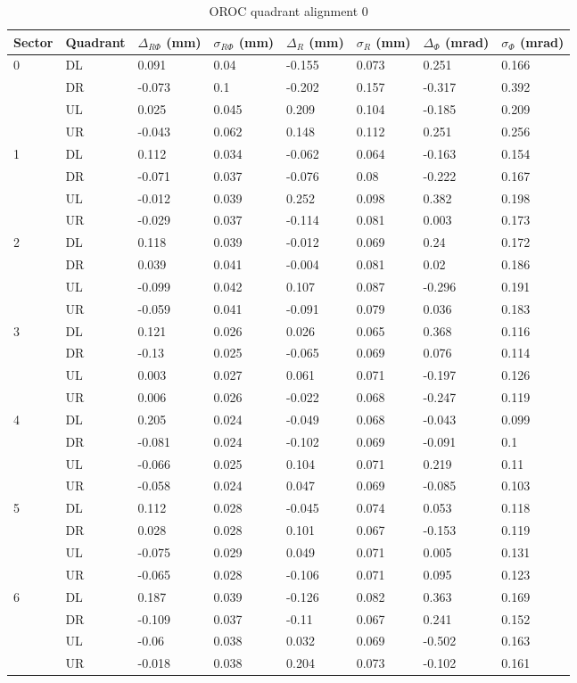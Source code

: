 \begin{table}
\caption{OROC quadrant alignment 0}
\begin{tabular}{|l|l|l|l|l|l|l|l|} \hline
Sector & Quadrant & $\Delta_{R\Phi}$ (mm)& $\sigma_{R\Phi}$ (mm) &
 $\Delta_{R}$ (mm)& $\sigma_{R}$ (mm) & $\Delta_{\Phi}$ (mrad)& $\sigma_{\Phi}$ (mrad)\\ \hline
0&DL&0.091&0.04&-0.155&0.073&0.251&0.166\\ \hline
&DR&-0.073&0.1&-0.202&0.157&-0.317&0.392\\ \hline
&UL&0.025&0.045&0.209&0.104&-0.185&0.209\\ \hline
&UR&-0.043&0.062&0.148&0.112&0.251&0.256\\ \hline
1&DL&0.112&0.034&-0.062&0.064&-0.163&0.154\\ \hline
&DR&-0.071&0.037&-0.076&0.08&-0.222&0.167\\ \hline
&UL&-0.012&0.039&0.252&0.098&0.382&0.198\\ \hline
&UR&-0.029&0.037&-0.114&0.081&0.003&0.173\\ \hline
2&DL&0.118&0.039&-0.012&0.069&0.24&0.172\\ \hline
&DR&0.039&0.041&-0.004&0.081&0.02&0.186\\ \hline
&UL&-0.099&0.042&0.107&0.087&-0.296&0.191\\ \hline
&UR&-0.059&0.041&-0.091&0.079&0.036&0.183\\ \hline
3&DL&0.121&0.026&0.026&0.065&0.368&0.116\\ \hline
&DR&-0.13&0.025&-0.065&0.069&0.076&0.114\\ \hline
&UL&0.003&0.027&0.061&0.071&-0.197&0.126\\ \hline
&UR&0.006&0.026&-0.022&0.068&-0.247&0.119\\ \hline
4&DL&0.205&0.024&-0.049&0.068&-0.043&0.099\\ \hline
&DR&-0.081&0.024&-0.102&0.069&-0.091&0.1\\ \hline
&UL&-0.066&0.025&0.104&0.071&0.219&0.11\\ \hline
&UR&-0.058&0.024&0.047&0.069&-0.085&0.103\\ \hline
5&DL&0.112&0.028&-0.045&0.074&0.053&0.118\\ \hline
&DR&0.028&0.028&0.101&0.067&-0.153&0.119\\ \hline
&UL&-0.075&0.029&0.049&0.071&0.005&0.131\\ \hline
&UR&-0.065&0.028&-0.106&0.071&0.095&0.123\\ \hline
6&DL&0.187&0.039&-0.126&0.082&0.363&0.169\\ \hline
&DR&-0.109&0.037&-0.11&0.067&0.241&0.152\\ \hline
&UL&-0.06&0.038&0.032&0.069&-0.502&0.163\\ \hline
&UR&-0.018&0.038&0.204&0.073&-0.102&0.161\\ \hline
\end{tabular}
\label{table:QudrantAlignement}
\end{table}
